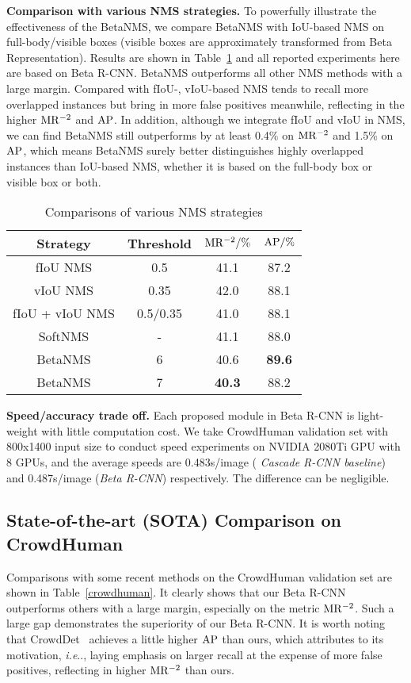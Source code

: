 \documentclass{article}
\makeatletter
\DeclareRobustCommand\onedot{\futurelet\@let@token\@onedot}
\def\@onedot{\ifx\@let@token.\else.\null\fi\xspace}
\def\ie{\emph{i.e}\onedot} \def\Ie{\emph{I.e}\onedot}
\makeatother
\begin{document}
\textbf{Comparison with various NMS strategies.}
To powerfully illustrate the effectiveness of the BetaNMS, we compare BetaNMS with IoU-based NMS on full-body/visible boxes (visible boxes are approximately transformed from Beta Representation).
Results are shown in Table~\ref{NMS} and all reported experiments here are based on Beta R-CNN.
BetaNMS outperforms all other NMS methods with a large margin.
Compared with fIoU-, vIoU-based NMS tends to recall more overlapped instances but bring in more false positives meanwhile, reflecting in the higher $\rm MR^{-2}$ and $\rm AP$.
In addition, although we integrate fIoU and vIoU in NMS, we can find BetaNMS still outperforms by at least 0.4\% on $\rm MR^{-2}$ and 1.5\% on $\rm AP$, which means BetaNMS surely better distinguishes highly overlapped instances than IoU-based NMS, whether it is based on the full-body box or visible box or both. 


\begin{table}[htbp]
    \centering
    \caption{Comparisons of various NMS strategies}
    \small
    \begin{tabular}{c|c|cc}
        \toprule
        Strategy & Threshold & $\rm MR^{-2}/\%$ & $\rm AP/\%$  \\
        \midrule
        fIoU NMS & 0.5 & 41.1 & 87.2 \\
        \midrule
vIoU NMS & 0.35 & 42.0 & 88.1 \\
\midrule
        fIoU + vIoU NMS & 0.5/0.35 & 41.0 & 88.1 \\
        \midrule    
        SoftNMS & - & 41.1 & 88.0 \\
        \midrule
        BetaNMS & 6 & 40.6 & \textbf{89.6} \\
        BetaNMS & 7 & \textbf{40.3} & 88.2 \\
\bottomrule
    \end{tabular}
    \label{NMS}
\end{table}

\textbf{Speed/accuracy trade off.}
Each proposed module in Beta R-CNN is light-weight with little computation cost. We take CrowdHuman validation set with 800x1400 input size to conduct speed experiments on NVIDIA 2080Ti GPU with 8 GPUs, and the average speeds are 0.483s/image ( \emph{Cascade R-CNN baseline}) and 0.487s/image (\emph{Beta R-CNN}) respectively.
The difference can be negligible.

\subsection{State-of-the-art (SOTA) Comparison on CrowdHuman}
Comparisons with some recent methods on the CrowdHuman validation set are shown in Table~\ref{crowdhuman}.
It clearly shows that our Beta R-CNN outperforms others with a large margin, especially on the metric $\rm MR^{-2}$.
Such a large gap demonstrates the superiority of our Beta R-CNN.
It is worth noting that CrowdDet~\cite{EMD} achieves a little higher $\rm AP$ than ours, which attributes to its motivation, \ie, laying emphasis on larger recall at the expense of more false positives, reflecting in higher $\rm MR^{-2}$ than ours.
\end{document}

